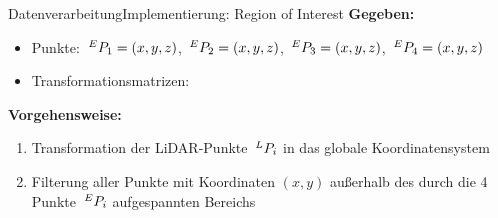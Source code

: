 \documentclass[169, handout	]{THIbeamer} %
\begin{document}
	\begin{frame}{Datenverarbeitung}{Implementierung: Region of Interest}	
		\textbf{Gegeben:} 
		\begin{itemize}
			\item Punkte: $\hspace*{0.2em}^E\vspace*{-0.2em}P_{1}=(x,y,z)$, $\hspace*{0.2em}^E\vspace*{-0.2em}P_{2}=(x,y,z)$, $\hspace*{0.2em}^E\vspace*{-0.2em}P_{3}=(x,y,z)$, $\hspace*{0.2em}^E\vspace*{-0.2em}P_{4}=(x,y,z)$		
			\item Transformationsmatrizen: 
		\end{itemize}
		\textbf{Vorgehensweise:}
		\begin{enumerate}
			\item Transformation der LiDAR-Punkte $\hspace*{0.2em}^L\vspace*{-0.2em}P_{i}$ in das globale Koordinatensystem 
			\item Filterung aller Punkte mit Koordinaten $(x,y)$ außerhalb des durch die 4 Punkte $\hspace*{0.2em}^E\vspace*{-0.2em}P_{i}$ aufgespannten Bereichs
		\end{enumerate}
	\end{frame}
\end{document}
